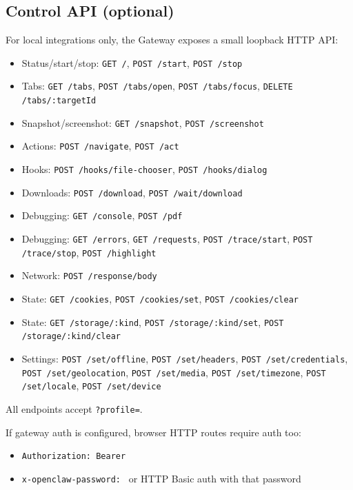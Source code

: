 \subsection{Control API (optional)}


For local integrations only, the Gateway exposes a small loopback HTTP API:

\begin{itemize}
  \item Status/start/stop: \texttt{GET /}, \texttt{POST /start}, \texttt{POST /stop}
  \item Tabs: \texttt{GET /tabs}, \texttt{POST /tabs/open}, \texttt{POST /tabs/focus}, \texttt{DELETE /tabs/:targetId}
  \item Snapshot/screenshot: \texttt{GET /snapshot}, \texttt{POST /screenshot}
  \item Actions: \texttt{POST /navigate}, \texttt{POST /act}
  \item Hooks: \texttt{POST /hooks/file-chooser}, \texttt{POST /hooks/dialog}
  \item Downloads: \texttt{POST /download}, \texttt{POST /wait/download}
  \item Debugging: \texttt{GET /console}, \texttt{POST /pdf}
  \item Debugging: \texttt{GET /errors}, \texttt{GET /requests}, \texttt{POST /trace/start}, \texttt{POST /trace/stop}, \texttt{POST /highlight}
  \item Network: \texttt{POST /response/body}
  \item State: \texttt{GET /cookies}, \texttt{POST /cookies/set}, \texttt{POST /cookies/clear}
  \item State: \texttt{GET /storage/:kind}, \texttt{POST /storage/:kind/set}, \texttt{POST /storage/:kind/clear}
  \item Settings: \texttt{POST /set/offline}, \texttt{POST /set/headers}, \texttt{POST /set/credentials}, \texttt{POST /set/geolocation}, \texttt{POST /set/media}, \texttt{POST /set/timezone}, \texttt{POST /set/locale}, \texttt{POST /set/device}
\end{itemize}


All endpoints accept \texttt{?profile=}.

If gateway auth is configured, browser HTTP routes require auth too:

\begin{itemize}
  \item \texttt{Authorization: Bearer }
  \item \texttt{x-openclaw-password: } or HTTP Basic auth with that password
\end{itemize}


